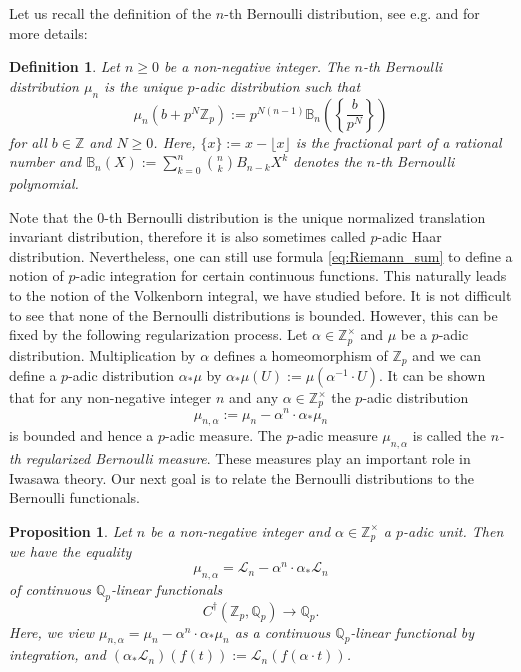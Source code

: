 \documentclass[12pt]{article}
\newtheorem{proposition}[theorem]{Proposition}
\newtheorem{definition}[theorem]{Definition}
\numberwithin{equation}{section}
\begin{document}
Let us recall the definition of the $n$-th Bernoulli distribution, see e.g. \cite[Ch. II, \S 5]{Kob84} and \cite[\S 12.2]{Was97} for more details:
\begin{definition}
Let $n\geqslant 0$ be a non-negative integer. The \emph{$n$-th Bernoulli distribution} $\mu_n$ is the unique $p$-adic distribution such that
\[
	\mu_n(b+p^N \mathbb{Z}_p)	:=p^{N(n-1)}\mathbb{B}_n\left( \left\{ \frac{b}{p^N} \right\}\right)
\]
for all $b\in \mathbb{Z}$ and $N\geqslant 0$. Here, $\{x \}:=x-\lfloor x\rfloor$ is the fractional part of a rational number and $\mathbb{B}_n(X):=\sum_{k=0}^n \binom{n}{k}B_{n-k} X^k$ denotes the $n$-th Bernoulli polynomial.
\end{definition}
Note that the $0$-th Bernoulli distribution is the unique normalized translation invariant distribution, therefore it is also sometimes called $p$-adic  Haar distribution. Nevertheless, one can still use formula \eqref{eq:Riemann_sum} to define a notion of $p$-adic integration for certain continuous functions. This naturally leads to the notion of the Volkenborn integral, we have studied before. It is not difficult to see that none of the Bernoulli distributions is bounded. However, this can be fixed by the following regularization process. Let $\alpha\in \mathbb{Z}_p^\times$ and $\mu$ be a $p$-adic distribution. Multiplication by $\alpha$ defines a homeomorphism of $\mathbb{Z}_p$ and we can define a $p$-adic distribution $\alpha_*\mu$ by $\alpha_*\mu (U):=\mu(\alpha^{-1}\cdot U)$. It can be shown that for any non-negative integer $n$ and any $\alpha\in \mathbb{Z}_p^\times$ the $p$-adic distribution
\[
	\mu_{n,\alpha}:=\mu_n-\alpha^n\cdot \alpha_*\mu_{n}
\]
is bounded and hence a $p$-adic measure. The $p$-adic measure $\mu_{n,\alpha}$ is called the \emph{$n$-th regularized Bernoulli measure}. These measures play an important role in Iwasawa theory. Our next goal is to relate the  Bernoulli distributions to the Bernoulli functionals. 
\begin{proposition}\label{prop:Comparison_Bernoulli}
	Let $n$ be a non-negative integer and $\alpha\in \mathbb{Z}_p^\times$ a $p$-adic unit. Then we have the  equality 
\[
	\mu_{n,\alpha}=\mathcal{L}_n -\alpha^n\cdot \alpha_*\mathcal{L}_{n}
\]	
	of continuous $\mathbb{Q}_p$-linear functionals
	\[
		C^{\dagger}(\mathbb{Z}_p,\mathbb{Q}_p)\to \mathbb{Q}_p.
	\]
	Here, we view $\mu_{n,\alpha}=\mu_n-\alpha^n\cdot \alpha_*\mu_{n}$ as a continuous $\mathbb{Q}_p$-linear functional by integration, and $(\alpha_*\mathcal{L}_{n})(f(t)):=\mathcal{L}_n(f(\alpha\cdot t))$.
\end{proposition}
\end{document}
